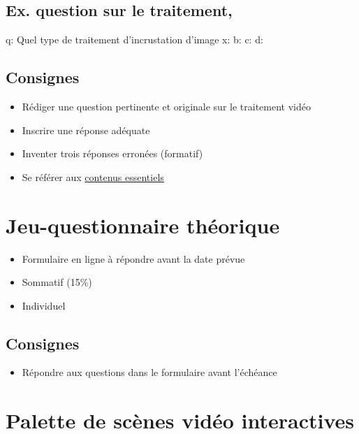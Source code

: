 \documentclass[
  french,
]{book}
\providecommand{\tightlist}{%
  \setlength{\itemsep}{0pt}\setlength{\parskip}{0pt}}
\begin{document}
\hypertarget{ex.-question-sur-le-traitement}{%
\subsection{Ex. question sur le traitement,}\label{ex.-question-sur-le-traitement}}

q: Quel type de traitement d'incrustation d'image
x:
b:
c:
d:

\hypertarget{consignes-1}{%
\subsection{Consignes}\label{consignes-1}}

\begin{itemize}
\tightlist
\item
  Rédiger une question pertinente et originale sur le traitement vidéo
\item
  Inscrire une réponse adéquate
\item
  Inventer trois réponses erronées (formatif)
\item
  Se référer aux \href{}{contenus essentiels}
\end{itemize}

\hypertarget{sommatif_3}{%
\section{Jeu-questionnaire théorique}\label{sommatif_3}}

\begin{itemize}
\tightlist
\item
  Formulaire en ligne à répondre avant la date prévue
\item
  Sommatif (15\%)
\item
  Individuel
\end{itemize}

\hypertarget{consignes-2}{%
\subsection{Consignes}\label{consignes-2}}

\begin{itemize}
\tightlist
\item
  Répondre aux questions dans le formulaire avant l'échéance
\end{itemize}

\hypertarget{sommatif_4}{%
\section{Palette de scènes vidéo interactives}\label{sommatif_4}}
\end{document}
